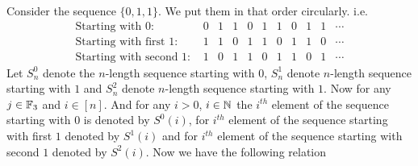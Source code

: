 \documentclass[a4paper, 11pt]{article}
\begin{document}
{Consider the sequence $\{0,1,1\}$. We put them in that order circularly. i.e. $$\begin{array}{lccccccccccc}
\text{Starting with 0: } &        0& 1& 1& 0& 1& 1& 0& 1& 1& \cdots\\
\text{Starting with first 1: } &  1& 1& 0& 1& 1& 0& 1& 1& 0& \cdots\\
\text{Starting with second 1: } & 1& 0& 1& 1& 0& 1& 1& 0& 1& \cdots
\end{array}$$Let $S_n^0$ denote the $n$-length sequence starting with $0$, $S_n^1$ denote $n$-length sequence starting with $1$ and $S_n^2$ denote $n$-length sequence starting with $1$. Now for any $j\in\mathbb{F}_3$ and $i\in[n]$. And for any $i>0$, $i\in\mathbb{N}$  the $i^{th}$ element of the sequence starting with $0$ is  denoted by $S^0(i)$, for $i^{th}$ element of the sequence starting with first $1$ denoted by $S^1(i)$ and  for $i^{th}$ element of the sequence starting with second $1$ denoted by $S^2(i)$. Now we have the following relation

}
\end{document}

